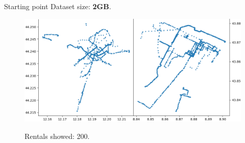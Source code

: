 \documentclass{beamer}
\begin{document}
\begin{frame}{Starting point}
Dataset size: \textbf{2GB}.
\begin{figure}[bt]
	\centering
	\includegraphics[width=\textwidth]{starting-point}
	\label{fig:starting-point}
	\caption{Rentals showed: 200.}
\end{figure}
\end{frame}
\end{document}
